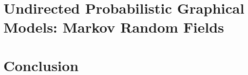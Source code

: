 \documentclass{StyFiles/usydthesis}
\begin{document}
\part{Undirected Probabilistic Graphical Models: Markov Random
  Fields}
\label{part:2}



\part{Conclusion}
\label{part:conclusion}






\printindex
\end{document}
